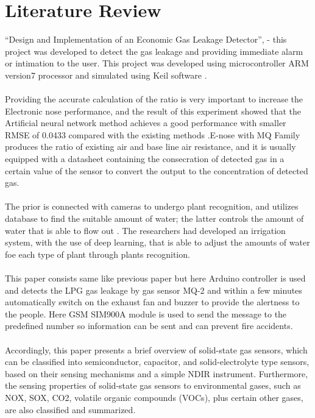 \chapter{\textbf{Literature Review}}
“Design and Implementation of an Economic Gas Leakage Detector”, - this project was developed to detect the gas leakage and providing immediate alarm or intimation to the user. This project was developed using microcontroller ARM version7 processor and simulated using Keil software \cite{amin2018design}.\\\\
Providing the accurate calculation of the ratio is very important to increase the Electronic nose performance, and the result of this experiment showed that the Artificial neural network method achieves a good performance with smaller RMSE of 0.0433 compared with the existing methods \cite{desai2017iot}.E-nose with MQ Family produces the ratio of existing air and base line air resistance, and it is usually equipped with a datasheet containing the consecration of detected gas in a certain value of the sensor to convert the output to the concentration of detected gas\cite{keshamoni2017smart}.\\\\
The prior is connected with cameras to undergo plant recognition, and utilizes database to find the suitable amount of water; the latter controls the amount of water that is able to flow out \cite{kim2014issaq}. The researchers had developed an irrigation system, with the use of deep learning, that is able to adjust the amounts of water foe each type of plant through plants recognition\cite{dutta2017iot}.\\\\
This paper consists same like previous paper but here Arduino controller is used and detects the LPG gas leakage by gas sensor\cite{sabilla2017estimating} MQ-2 and within a few minutes automatically switch on the exhaust fan and buzzer to provide the alertness to the people. Here GSM SIM900A module is used to send the message to the predefined number so information can be sent and can prevent fire accidents\cite{savitha2018survey,keshamoni2017smart,koduru2018integrated,mahalingam2012design,alekseev2017information}.\\\\
Accordingly, this paper presents a brief overview of solid-state gas sensors, which can be classified into semiconductor, capacitor, and solid-electrolyte type sensors, based on their sensing mechanisms and a simple NDIR instrument\cite{mahalingam2012design}. Furthermore, the sensing properties of solid-state gas sensors to environmental gases, such as NOX, SOX, CO2, volatile organic compounds (VOCs), plus certain other gases, are also classified and summarized\cite{lee2001environmental}.\\\\

